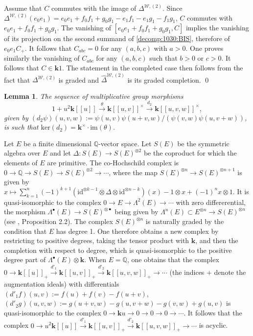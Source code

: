 \documentclass[10pt]{amsart}
\newtheorem{lem}[thm]{Lemma}
\numberwithin{equation}{subsection}
\begin{document}
Assume that $C$ commutes with the image of $\Delta^{\mathcal W,(2)}$. 
Since $\Delta^{\mathcal W,(2)}(e_0e_1)=e_0e_1+f_0f_1+g_0g_1-e_1f_1-e_1g_1-f_1g_1$, $C$ commutes with 
$e_0e_1+f_0f_1+g_0g_1$. The vanishing of $[e_0e_1+f_0f_1+g_0g_1,C]$ implies the vanishing of its projection on the
second summand of \eqref{decomp:1030:BIS}, therefore of $e_0e_1 C_+$. It follows that $C_{abc}=0$ 
for any $(a,b,c)$ with $a>0$. One proves similarly the vanishing of $C_{abc}$ for any $(a,b,c)$ such that $b>0$ or 
$c>0$. It follows that $C\in\mathbf k1$. The statement in the completed case then follows from the fact that  
$\Delta^{\mathcal W,(2)}$ is graded and $\hat\Delta^{\mathcal W,(2)}$ is its graded completion. \hfill\qed\medskip 

\begin{lem}\label{lemma:acyclicity:BIS}
The sequence of multiplicative group morphisms 
\begin{equation}\label{wanted:complex:BIS}
1+u^2\mathbf k[[u]]\stackrel{\theta}{\to}\mathbf k[[u,v]]^\times\stackrel{d_2}{\to}\mathbf k[[u,v,w]]^\times, 
\end{equation}
given by $(d_2\psi)(u,v,w):=
\psi(u,v)\psi(u+v,w)/(\psi(v,w)\psi(u,v+w))$, is such that $\mathrm{ker}(d_2)=\mathbf k^\times\cdot \mathrm{im}(\theta)$.  
\end{lem}

\proof Let $E$ be a finite dimensional $\mathbb Q$-vector space. Let $S(E)$ be the symmetric algebra over $E$ and let 
$\Delta:S(E)\to S(E)^{\otimes2}$ be the coproduct for which the elements of $E$ are primitive. The co-Hochschild complex
is $0\to \mathbb Q\to S(E)\to S(E)^{\otimes2}\to\cdots$, where the map $S(E)^{\otimes n}\to S(E)^{\otimes n+1}$ is given by 
$x\mapsto \sum_{k=1}^n(-1)^{k+1}(\mathrm{id}^{\otimes k-1}\otimes\Delta\otimes\mathrm{id}^{\otimes n-k})(x)
-1\otimes x+(-1)^nx\otimes 1$. It is quasi-isomorphic to the complex $0\to E\to \Lambda^2(E)\to\cdots$ with zero 
differerential, the morphism $\Lambda^\bullet(E)\to S(E)^{\otimes\bullet}$ being given by $\Lambda^n(E)\subset E^{\otimes n}
\to S(E)^{\otimes n}$ (see \cite{Dr}, Proposition 2.2). The complex $S(E)^{\otimes n}$ is naturally graded by the condition 
that $E$ has degree 1. One therefore obtains a new complex by restricting to positive degrees, taking the tensor product with 
$\mathbf k$, and then the completion with respect to degree, which is quasi-isomorphic to the positive degree part of 
$\Lambda^\bullet(E)\otimes\mathbf k$. When $E=\mathbb Q$, one obtains that the complex 
$0\to\mathbf k[[u]]_+\stackrel{d'_1}{\to}\mathbf k[[u,v]]_+\stackrel{d'_2}{\to}
\mathbf k[[u,v,w]]_+\to\cdots$  (the indices $+$ denote the augmentation ideals) with differentials 
$(d'_1f)(u,v):=f(u)+f(v)-f(u+v)$, $(d'_2g)(u,v,w):=
g(u+v,w)-g(u,v+w)-g(v,w)+g(u,v)$ is quasi-isomorphic to the complex $0\to \mathbf k u\to 0\to 0\to 0\to\cdots$. 
It follows that the complex
$0\to u^2\mathbf k[[u]]\stackrel{d'_1}{\to}\mathbf k[[u,v]]_+\stackrel{d'_2}{\to}
\mathbf k[[u,v,w]]_+\to\cdots$ is acyclic. 
\end{document}
